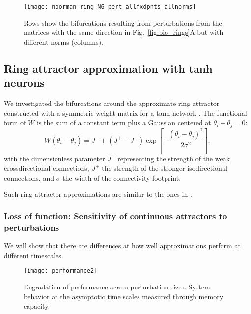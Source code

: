 \documentclass{article} %
\newcounter{ct}
\theoremstyle{definition}
\theoremstyle{remark}
\begin{document}
\begin{figure}[tbhp]
     \centering
    \texttt{[image: noorman\_ring\_N6\_pert\_allfxdpnts\_allnorms]}
       \caption{Rows show the bifurcations resulting from perturbations from the matrices with the same direction in Fig.~\ref{fig:bio_rings}A but with different norms (columns). }
         \label{fig:noorman_ring_allfxdpnts_allnorm}
\end{figure}






\newpage
\subsection{Ring attractor approximation with tanh neurons}\label{sec:supp:goodridge}


We investigated the bifurcations around the approximate ring attractor constructed with a symmetric weight matrix for a tanh network  \citep{compte2000synaptic, seeholzer2017efficient}.
The functional form of $W$ is the sum of a constant term plus a Gaussian centered at $\theta_i - \theta_j =0$:
\begin{equation}
W(\theta_i - \theta_j) = J^- + (J^+ - J^-) \exp\left[ -\frac{(\theta_i - \theta_j)^2}{2\sigma^2} \right],
\end{equation}
with the dimensionless parameter $J^-$ representing the strength of the weak crossdirectional connections, $J^+$ the strength of the stronger isodirectional connections,
 and $\sigma$ the width of the connectivity footprint.
 
 
 Such ring attractor approximations are similar to the ones in \citep{goodridge2000, samsonovich1997path, redish1996coupled}. %
 



\subsubsection{Loss of function: Sensitivity of continuous attractors to perturbations}\label{sec:supp:boa}

We will show that there are differences at how well approximations perform at different timescales.

\begin{figure}[tbhp]
  \centering
  \texttt{[image: performance2]}
  \caption{Degradation of performance across perturbation sizes. System behavior at the asymptotic time scales measured through memory capacity. }
  \label{fig:performance}
\end{figure}
\end{document}
